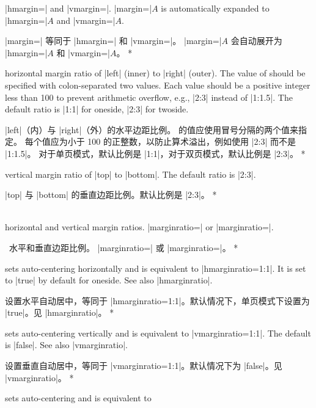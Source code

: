 \begin{Options}
\begin{paracol}{2}
  |hmargin=| and |vmargin=|.
  |margin=|$A$ is automatically expanded to |hmargin=|$A$ and |vmargin=|$A$.
\switchcolumn\item[margin] |margin=| 等同于
|hmargin=| 和 |vmargin=|。
|margin=|$A$ 会自动展开为 |hmargin=|$A$ 和 |vmargin=|$A$。
\switchcolumn[0]*\item[hmarginratio]
  horizontal margin ratio of |left| (inner) to |right| (outer). 
  The value of  should be specified with colon-separated 
  two values. Each value should be a positive integer less than 100
  to prevent arithmetic overflow, e.g., |2:3| instead of |1:1.5|.
  The default ratio is |1:1| for oneside, |2:3| for twoside.
\switchcolumn\item[hmarginratio]
|left|（内）与 |right|（外）的水平边距比例。
 的值应使用冒号分隔的两个值来指定。
每个值应为小于 100 的正整数，以防止算术溢出，例如使用 |2:3| 而不是 |1:1.5|。
对于单页模式，默认比例是 |1:1|，对于双页模式，默认比例是 |2:3|。
\switchcolumn[0]*\item[vmarginratio]
   vertical margin ratio of |top| to |bottom|. The default ratio is |2:3|.
\switchcolumn\item[vmarginratio]
|top| 与 |bottom| 的垂直边距比例。默认比例是 |2:3|。
\switchcolumn[0]*\item[marginratio\OR ratio]~\\
   horizontal and vertical margin ratios.
  |marginratio=| or
  |marginratio=|.
\switchcolumn\item[marginratio\OR ratio]\
水平和垂直边距比例。
|marginratio=| 或
|marginratio=|。
\switchcolumn[0]*\item[hcentering] sets auto-centering horizontally and is
  equivalent to |hmarginratio=1:1|. It is set to |true| by default for
  oneside. See also |hmarginratio|.
\switchcolumn\item[hcentering] 设置水平自动居中，等同于 |hmarginratio=1:1|。默认情况下，单页模式下设置为 |true|。见 |hmarginratio|。
\switchcolumn[0]*\item[vcentering] sets auto-centering vertically and is
  equivalent to |vmarginratio=1:1|. The default is |false|.
  See also |vmarginratio|.
\switchcolumn\item[vcentering] 设置垂直自动居中，等同于 |vmarginratio=1:1|。默认情况下为 |false|。见 |vmarginratio|。
\switchcolumn[0]*\item[centering] sets auto-centering and is equivalent to

\end{paracol}
\end{Options}
